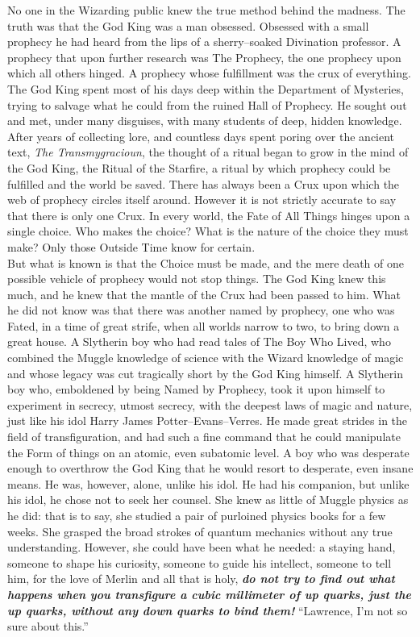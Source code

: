 \SmallVSpace
No one in the Wizarding public knew the true method behind the madness. The truth was that the God King was a man obsessed. Obsessed with a small prophecy he had heard from the lips of a sherry\mbox{--}soaked Divination professor. A prophecy that upon further research was The Prophecy, the one prophecy upon which all others hinged. A prophecy whose fulfillment was the crux of everything. The God King spent most of his days deep within the Department of Mysteries, trying to salvage what he could from the ruined Hall of Prophecy. He sought out and met, under many disguises, with many students of deep, hidden knowledge.
\SmallVSpace
After years of collecting lore, and countless days spent poring over the ancient text, \emph{The Transmygracioun}, the thought of a ritual began to grow in the mind of the God King, the Ritual of the Starfire, a ritual by which prophecy could be fulfilled and the world be saved.
\SmallVSpace
There has always been a Crux upon which the web of prophecy circles itself around. However it is not strictly accurate to say that there is only one Crux. In every world, the Fate of All Things hinges upon a single choice. Who makes the choice? What is the nature of the choice they must make? Only those Outside Time know for certain.\\But what is known is that the Choice must be made, and the mere death of one possible vehicle of prophecy would not stop things. The God King knew this much, and he knew that the mantle of the Crux had been passed to him.
\SmallVSpace
What he did not know was that there was another named by prophecy, one who was Fated, in a time of great strife, when all worlds narrow to two, to bring down a great house. A Slytherin boy who had read tales of The Boy Who Lived, who combined the Muggle knowledge of science with the Wizard knowledge of magic and whose legacy was cut tragically short by the God King himself. A Slytherin boy who, emboldened by being Named by Prophecy, took it upon himself to experiment in secrecy, utmost secrecy, with the deepest laws of magic and nature, just like his idol Harry James Potter\mbox{--}Evans\mbox{--}Verres. He made great strides in the field of transfiguration, and had such a fine command that he could manipulate the Form of things on an atomic, even subatomic level. A boy who was desperate enough to overthrow the God King that he would resort to desperate, even insane means.
\SmallVSpace
He was, however, alone, unlike his idol. He had his companion, but unlike his idol, he chose not to seek her counsel. She knew as little of Muggle physics as he did: that is to say, she studied a pair of purloined physics books for a few weeks. She grasped the broad strokes of quantum mechanics without any true understanding. However, she could have been what he needed: a staying hand, someone to shape his curiosity, someone to guide his intellect, someone to tell him, for the love of Merlin and all that is holy, \emph{\textbf{do not try to find out what happens when you transfigure a cubic millimeter of up quarks, just the up quarks, without any down quarks to bind them!}}
\simpleline
“Lawrence, I’m not so sure about this.”

